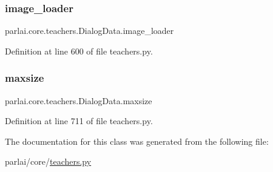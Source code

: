 \subsubsection{\texorpdfstring{image\+\_\+loader}{image\_loader}}
{\footnotesize\ttfamily parlai.\+core.\+teachers.\+Dialog\+Data.\+image\+\_\+loader}



Definition at line 600 of file teachers.\+py.

\mbox{\label{classparlai_1_1core_1_1teachers_1_1DialogData_a9c25f1914274bbc5b6aeae335e98957a}} 
\subsubsection{\texorpdfstring{maxsize}{maxsize}}
{\footnotesize\ttfamily parlai.\+core.\+teachers.\+Dialog\+Data.\+maxsize\hspace{0.3cm}{\ttfamily [static]}}



Definition at line 711 of file teachers.\+py.



The documentation for this class was generated from the following file\+:\begin{DoxyCompactItemize}
\item 
parlai/core/\hyperlink{teachers_8py}{teachers.\+py}\end{DoxyCompactItemize}
